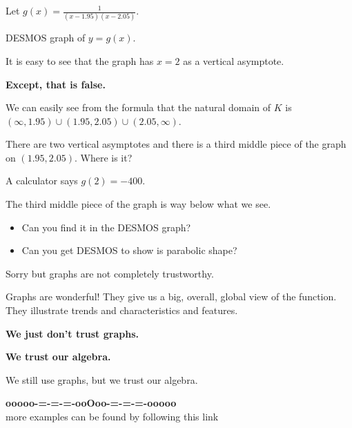 \documentclass{ximera}
\begin{document}
\begin{example}


Let $g(x) = \frac{1}{(x-1.95)(x-2.05)}$.


DESMOS graph of $y = g(x)$.



\begin{center}
\end{center}



It is easy to see that the graph has $x=2$ as a vertical asymptote. 

\textbf{\textcolor{red!70!black}{Except, that is false.}} 

We can easily see from the formula that the natural domain of $K$ is $(\infty, 1.95) \cup (1.95, 2.05) \cup (2.05, \infty)$.

There are two vertical asymptotes and there is a third middle piece of the graph on $(1.95, 2.05)$. Where is it?


A calculator says $g(2)=-400$. 

The third middle piece of the graph is way below what we see.  

\begin{itemize}
\item Can you find it in the DESMOS graph?
\item Can you get DESMOS to show is parabolic shape?
\end{itemize}




\end{example}


Sorry but graphs are not completely trustworthy.  


Graphs are wonderful!  They give us a big, overall, global view of the function.  They illustrate trends and characteristics and features.


\begin{center}
\textbf{\textcolor{red!70!black}{We just don't trust graphs.}}
\end{center}



\begin{center}
\textbf{\textcolor{blue!55!black}{We trust our algebra.}}
\end{center}



We still use graphs, but we trust our algebra.









\begin{onlineOnly}
\begin{center}
\textbf{\textcolor{green!50!black}{ooooo-=-=-=-ooOoo-=-=-=-ooooo}} \\

more examples can be found by following this link\\ 

\end{center}
\end{onlineOnly}
\end{document}
